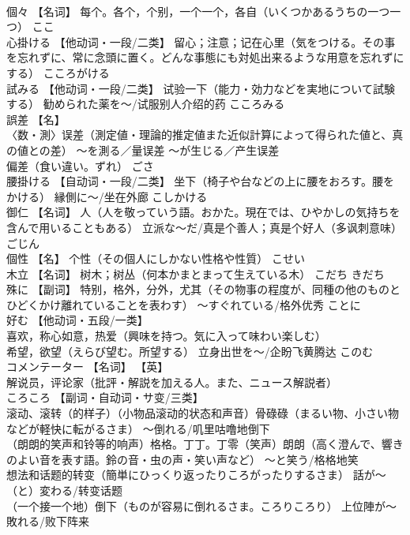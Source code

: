 \documentclass[8pt]{extreport}
\begin{document}
\begin{CJK}{UTF8}{min}
\\	個々	【名词】 每个。各个，个别，一个一个，各自（いくつかあるうちの一つ一つ）	ここ	
\\	心掛ける	【他动词・一段/二类】 留心；注意；记在心里（気をつける。その事を忘れずに、常に念頭に置く。どんな事態にも対処出来るような用意を忘れずにする）	こころがける	
\\	試みる	【他动词・一段/二类】 试验一下（能力・効力などを実地について試験する） 勧められた薬を～/试服别人介绍的药	こころみる	
\\	誤差	【名】 
\\	〈数・測〉误差（測定値・理論的推定値また近似計算によって得られた値と、真の値との差） ～を測る／量误差 ～が生じる／产生误差 
\\	偏差（食い違い。ずれ）	ごさ	
\\	腰掛ける	【自动词・一段/二类】 坐下（椅子や台などの上に腰をおろす。腰をかける） 縁側に～/坐在外廊	こしかける	
\\	御仁	【名词】 人（人を敬っていう語。おかた。現在では、ひやかしの気持ちを含んで用いることもある） 立派な～だ/真是个善人；真是个好人（多讽刺意味）	ごじん	
\\	個性	【名】 个性（その個人にしかない性格や性質）	こせい	
\\	木立	【名词】 树木；树丛（何本かまとまって生えている木）	こだち きだち	
\\	殊に	【副词】 特别，格外，分外，尤其（その物事の程度が、同種の他のものとひどくかけ離れていることを表わす） ～すぐれている/格外优秀	ことに	
\\	好む	【他动词・五段/一类】 
\\	喜欢，称心如意，热爱（興味を持つ。気に入って味わい楽しむ） 
\\	希望，欲望（えらび望む。所望する） 立身出世を～/企盼飞黄腾达	このむ	
\\	コメンテーター	【名词】 【英】
\\	解说员，评论家（批評・解説を加える人。また、ニュース解説者）		
\\	ころころ	【副词・自动词・サ变/三类】 
\\	滚动、滚转（的样子）（小物品滚动的状态和声音）骨碌碌（まるい物、小さい物などが軽快に転がるさま） ～倒れる/叽里咕噜地倒下 
\\	（朗朗的笑声和铃等的响声）格格。丁丁。丁零（笑声）朗朗（高く澄んで、響きのよい音を表す語。鈴の音・虫の声・笑い声など） ～と笑う/格格地笑 
\\	想法和话题的转变（簡単にひっくり返ったりころがったりするさま） 話が～（と）変わる/转变话题 
\\	（一个接一个地）倒下（ものが容易に倒れるさま。ころりころり） 上位陣が～敗れる/败下阵来 

\end{CJK}
\end{document}
